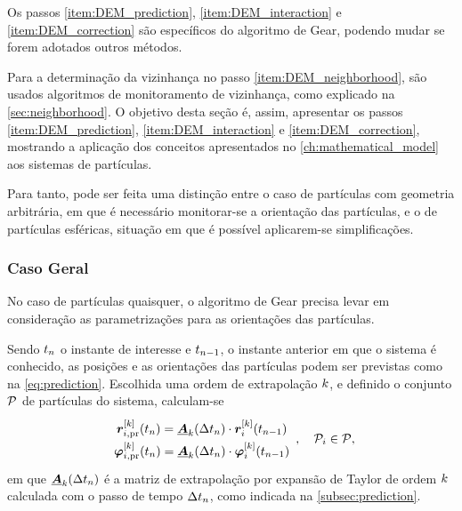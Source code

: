 Os passos \ref{item:DEM_prediction}, \ref{item:DEM_interaction} e \ref{item:DEM_correction} são específicos do algoritmo de Gear, podendo mudar se forem adotados outros métodos.

Para a determinação da vizinhança no passo \ref{item:DEM_neighborhood}, são usados algoritmos de monitoramento de vizinhança, como explicado na \cref{sec:neighborhood}. O objetivo desta seção é, assim, apresentar os passos \ref{item:DEM_prediction}, \ref{item:DEM_interaction} e \ref{item:DEM_correction}, mostrando a aplicação dos conceitos apresentados no \cref{ch:mathematical_model} aos sistemas de partículas.


Para tanto, pode ser feita uma distinção entre o caso de partículas com geometria arbitrária, em que é necessário monitorar-se a orientação das partículas, e o de partículas esféricas, situação em que é possível aplicarem-se simplificações.

\subsubsection*{Caso Geral}

No caso de partículas quaisquer, o algoritmo de Gear precisa levar em consideração as parametrizações para as orientações das partículas.

Sendo \(\instant[n]\) o instante de interesse e \(\instant[n-1]\), o instante anterior em que o sistema é conhecido, as posições e as orientações das partículas podem ser previstas como na \cref{eq:prediction}. Escolhida uma ordem de extrapolação \(k\), e definido o conjunto \(\mathcal{P}\) de partículas do sistema, calculam-se
\begin{equation*}
	\def\arraystretch{1.5}
	\begin{array}{c}
		\drvec{\taylorOrder}{\positionipr}\pqty{\instant[n]} = \extrapolationMatrix{\taylorOrder}[\Dt[n]]\cdot\drvec{\taylorOrder}{\positioni}\pqty{\instant[n-1]} \\
		\drvec{\taylorOrder}{\orientationipr}\pqty{\instant[n]} = \extrapolationMatrix{\taylorOrder}[\Dt[n]]\cdot\drvec{\taylorOrder}{\orientationi}\pqty{\instant[n-1]} \\
	\end{array}, \quad \particlei \in \particleSet,
\end{equation*}
em que \(\extrapolationMatrix{\taylorOrder}[\Dt[n]]\) é a matriz de extrapolação por expansão de Taylor de ordem \(k\) calculada com o passo de tempo \(\Dt[n]\), como indicada na \cref{subsec:prediction}.


